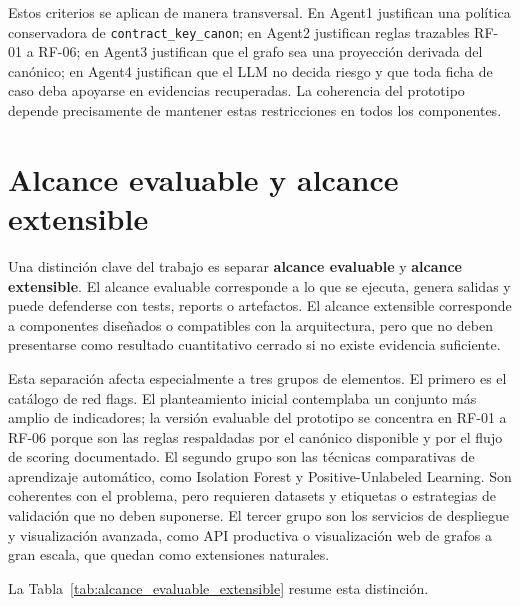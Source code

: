 \documentclass[11pt,a4paper,spanish]{book}
\numberwithin{equation}{chapter}
\numberwithin{figure}{chapter}
\begin{document}
Estos criterios se aplican de manera transversal. En Agent1 justifican una pol{\'i}tica conservadora
de \texttt{contract\_key\_canon}; en Agent2 justifican reglas trazables RF-01 a RF-06; en Agent3
justifican que el grafo sea una proyecci{\'o}n derivada del can{\'o}nico; en Agent4 justifican que el
LLM no decida riesgo y que toda ficha de caso deba apoyarse en evidencias recuperadas. La coherencia
del prototipo depende precisamente de mantener estas restricciones en todos los componentes.

\section{Alcance evaluable y alcance extensible}
\label{sec:alcance_evaluable_extensible}

Una distinci{\'o}n clave del trabajo es separar \textbf{alcance evaluable} y \textbf{alcance extensible}.
El alcance evaluable corresponde a lo que se ejecuta, genera salidas y puede defenderse con tests,
reports o artefactos. El alcance extensible corresponde a componentes dise{\~n}ados o compatibles con
la arquitectura, pero que no deben presentarse como resultado cuantitativo cerrado si no existe
evidencia suficiente.

Esta separaci{\'o}n afecta especialmente a tres grupos de elementos. El primero es el cat{\'a}logo de
red flags. El planteamiento inicial contemplaba un conjunto m{\'a}s amplio de indicadores; la versi{\'o}n
evaluable del prototipo se concentra en RF-01 a RF-06 porque son las reglas respaldadas por el can{\'o}nico
disponible y por el flujo de scoring documentado. El segundo grupo son las t{\'e}cnicas comparativas
de aprendizaje autom{\'a}tico, como Isolation Forest y Positive-Unlabeled Learning. Son coherentes con
el problema, pero requieren datasets y etiquetas o estrategias de validaci{\'o}n que no deben
suponerse. El tercer grupo son los servicios de despliegue y visualizaci{\'o}n avanzada, como API
productiva o visualizaci{\'o}n web de grafos a gran escala, que quedan como extensiones naturales.

La Tabla~\ref{tab:alcance_evaluable_extensible} resume esta distinci{\'o}n.
\end{document}
